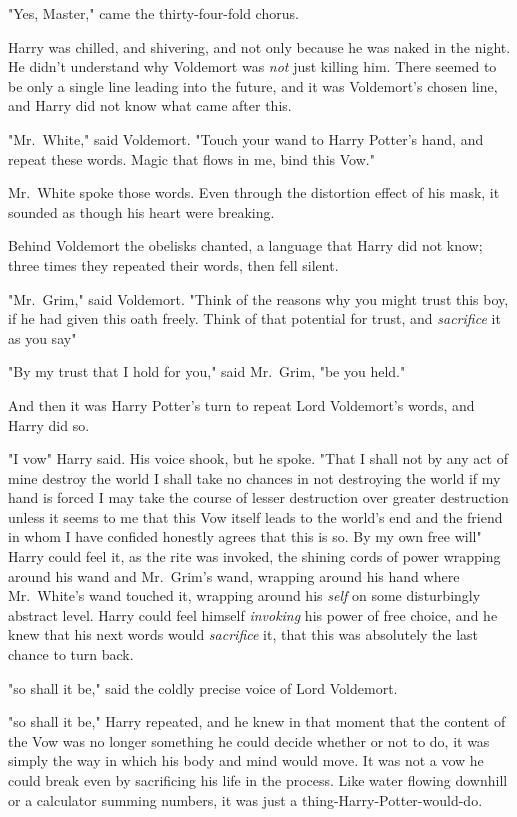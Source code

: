 "Yes, Master," came the thirty-four-fold chorus.

Harry was chilled, and shivering, and not only because he was naked in the
night. He didn't understand why Voldemort was \emph{not} just killing him.
There seemed to be only a single line leading into the future, and it was
Voldemort's chosen line, and Harry did not know what came after this.

"Mr.~White," said Voldemort. "Touch your wand to Harry Potter's hand, and
repeat these words. Magic that flows in me, bind this Vow."

Mr.~White spoke those words. Even through the distortion effect of his mask, it
sounded as though his heart were breaking.

Behind Voldemort the obelisks chanted, a language that Harry did not know;
three times they repeated their words, then fell silent.

"Mr.~Grim," said Voldemort. "Think of the reasons why you might trust this boy,
if he had given this oath freely. Think of that potential for trust, and
\emph{sacrifice} it as you say{\el}"

"By my trust that I hold for you," said Mr.~Grim, "be you held."

And then it was Harry Potter's turn to repeat Lord Voldemort's words, and Harry
did so.

"I vow{\el}" Harry said. His voice shook, but he spoke. "That I shall
not{\el} by any act of mine{\el} destroy the world{\el} I shall take
no chances{\el} in not destroying the world{\el} if my hand is
forced{\el} I may take the course{\el} of lesser destruction over greater
destruction{\el} unless it seems to me that this Vow itself{\el} leads to
the world's end{\el} and the friend{\el} in whom I have confided
honestly{\el} agrees that this is so. By my own free will{\el}" Harry
could feel it, as the rite was invoked, the shining cords of power wrapping
around his wand and Mr.~Grim's wand, wrapping around his hand where Mr.~White's
wand touched it, wrapping around his \emph{self} on some disturbingly abstract
level. Harry could feel himself \emph{invoking} his power of free choice, and
he knew that his next words would \emph{sacrifice} it, that this was absolutely
the last chance to turn back.

"{\el}so shall it be," said the coldly precise voice of Lord Voldemort.

"{\el}so shall it be," Harry repeated, and he knew in that moment that the
content of the Vow was no longer something he could decide whether or not to
do, it was simply the way in which his body and mind would move. It was not a
vow he could break even by sacrificing his life in the process. Like water
flowing downhill or a calculator summing numbers, it was just a
thing-Harry-Potter-would-do.

